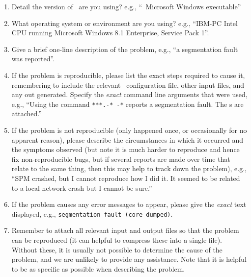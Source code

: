 \begin{enumerate}
\item Detail the version of \CNAME\ are you using? e.g., ``\CNAME\ \VER Microsoft Windows executable''

\item What operating system or environment are you using? e.g., ``IBM-PC Intel CPU running Microsoft Windows 8.1 Enterprise, Service Pack 1''.

\item Give a brief one-line description of the problem, e.g., ``a segmentation fault was reported''.

\item If the problem is reproducible, please list the exact steps required to cause it, remembering to include the relevant \CNAME\ configuration file, other input files, and any out generated. Specify the \emph{exact} command line arguments that were used, e.g., ``Using the command \texttt{***.-* -*} reports a segmentation fault. The \config s are attached.''

\item If the problem is not reproducible (only happened once, or occasionally for no apparent reason), please describe the circumstances in which it occurred and the symptoms observed (but note it is much harder to reproduce and hence fix non-reproducible bugs, but if several reports are made over time that relate to the same thing, then this may help to track down the problem), e.g., ``SPM crashed, but I cannot reproduce how I did it. It seemed to be related to a local network crash but I cannot be sure.''

\item If the problem causes any error messages to appear, please give the \emph{exact} text displayed, e.g., \texttt{segmentation fault (core dumped)}.

\item Remember to attach all relevant input and output files so that the problem can be reproduced (it can helpful to compress these into a single file). Without these, it is usually not possible to determine the cause of the problem, and we are unlikely to provide any assistance. Note that it is helpful to be as specific as possible when describing the problem.

\end{enumerate}
